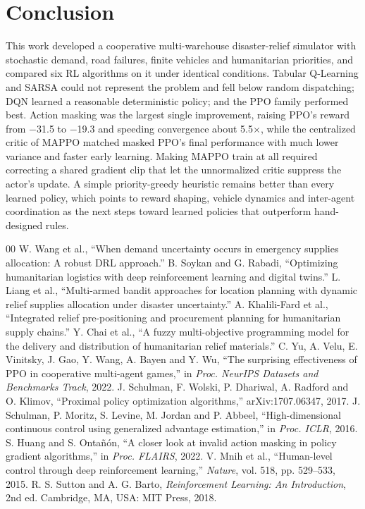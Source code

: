 \documentclass[conference]{IEEEtran}
\begin{document}
\section{Conclusion}
This work developed a cooperative multi-warehouse disaster-relief simulator with stochastic demand, road failures, finite vehicles and humanitarian priorities, and compared six RL algorithms on it under identical conditions. Tabular Q-Learning and SARSA could not represent the problem and fell below random dispatching; DQN learned a reasonable deterministic policy; and the PPO family performed best. Action masking was the largest single improvement, raising PPO's reward from $-$31.5 to $-$19.3 and speeding convergence about 5.5$\times$, while the centralized critic of MAPPO matched masked PPO's final performance with much lower variance and faster early learning. Making MAPPO train at all required correcting a shared gradient clip that let the unnormalized critic suppress the actor's update. A simple priority-greedy heuristic remains better than every learned policy, which points to reward shaping, vehicle dynamics and inter-agent coordination as the next steps toward learned policies that outperform hand-designed rules.


\begin{thebibliography}{00}
 W. Wang et al., ``When demand uncertainty occurs in emergency supplies allocation: A robust DRL approach.''
 B. Soykan and G. Rabadi, ``Optimizing humanitarian logistics with deep reinforcement learning and digital twins.''
 L. Liang et al., ``Multi-armed bandit approaches for location planning with dynamic relief supplies allocation under disaster uncertainty.''
 A. Khalili-Fard et al., ``Integrated relief pre-positioning and procurement planning for humanitarian supply chains.''
 Y. Chai et al., ``A fuzzy multi-objective programming model for the delivery and distribution of humanitarian relief materials.''
 C. Yu, A. Velu, E. Vinitsky, J. Gao, Y. Wang, A. Bayen and Y. Wu, ``The surprising effectiveness of PPO in cooperative multi-agent games,'' in \emph{Proc. NeurIPS Datasets and Benchmarks Track}, 2022.
 J. Schulman, F. Wolski, P. Dhariwal, A. Radford and O. Klimov, ``Proximal policy optimization algorithms,'' arXiv:1707.06347, 2017.
 J. Schulman, P. Moritz, S. Levine, M. Jordan and P. Abbeel, ``High-dimensional continuous control using generalized advantage estimation,'' in \emph{Proc. ICLR}, 2016.
 S. Huang and S. Onta\~{n}\'{o}n, ``A closer look at invalid action masking in policy gradient algorithms,'' in \emph{Proc. FLAIRS}, 2022.
 V. Mnih et al., ``Human-level control through deep reinforcement learning,'' \emph{Nature}, vol. 518, pp. 529--533, 2015.
 R. S. Sutton and A. G. Barto, \emph{Reinforcement Learning: An Introduction}, 2nd ed. Cambridge, MA, USA: MIT Press, 2018.
\end{thebibliography}
\end{document}
